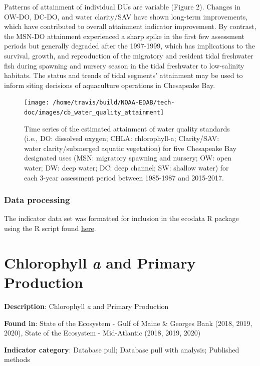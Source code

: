 \documentclass[
]{book}
\begin{document}
Patterns of attainment of individual DUs are variable (Figure 2). Changes in OW-DO, DC-DO, and water clarity/SAV have shown long-term improvements, which have contributed to overall attainment indicator improvement. By contrast, the MSN-DO attainment experienced a sharp spike in the first few assessment periods but generally degraded after the 1997-1999, which has implications to the survival, growth, and reproduction of the migratory and resident tidal freshwater fish during spawning and nursery season in the tidal freshwater to low-salinity habitats. The status and trends of tidal segments' attainment may be used to inform siting decisions of aquaculture operations in Chesapeake Bay.

\begin{figure}
\texttt{[image: /home/travis/build/NOAA-EDAB/tech-doc/images/cb\_water\_quality\_attainment]} \caption{Time series of the estimated attainment of water quality standards (i.e., DO: dissolved oxygen; CHLA: chlorophyll-a; Clarity/SAV: water clarity/submerged aquatic vegetation) for five Chesapeake Bay designated uses (MSN: migratory spawning and nursery; OW: open water; DW: deep water; DC: deep channel; SW: shallow water) for each 3-year assessment period between 1985-1987 and 2015-2017.}\label{fig:unnamed-chunk-8}
\end{figure}

\hypertarget{data-processing-5}{%
\subsection{Data processing}\label{data-processing-5}}

The indicator data set was formatted for inclusion in the ecodata R package using the R script found \href{https://github.com/NOAA-EDAB/ecodata/blob/master/data-raw/get_ches_bay_wq.R}{here}.

\hypertarget{chl-pp}{%
\chapter{\texorpdfstring{Chlorophyll \emph{a} and Primary Production}{Chlorophyll a and Primary Production}}\label{chl-pp}}

\textbf{Description}: Chlorophyll \emph{a} and Primary Production

\textbf{Found in}: State of the Ecosystem - Gulf of Maine \& Georges Bank (2018, 2019, 2020), State of the Ecosystem - Mid-Atlantic (2018, 2019, 2020)

\textbf{Indicator category}: Database pull; Database pull with analysis; Published methods
\end{document}
